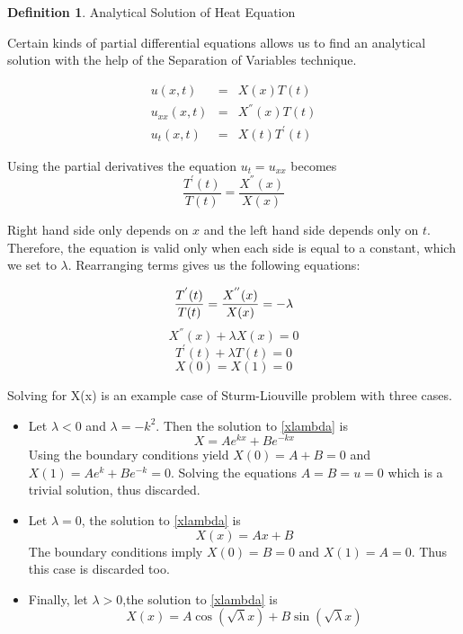 \documentclass[12pt, oneside]{book}
\theoremstyle{plain}
\theoremstyle{definition}
\newtheorem{definition}[theorem]{Definition}
\begin{document}
\begin{definition}\label{heatAnal} Analytical Solution of Heat Equation

Certain kinds of partial differential equations allows us to find an analytical solution with the help of the Separation of Variables technique.

\begin{eqnarray}
u(x,t) &=& X(x) T(t) \\[10pt]
u_{xx}(x, t) &=& X^{''}(x) T(t) \\[10pt]
u_t (x,t) &=& X(t) T^{'}(t)
\end{eqnarray}

Using the partial derivatives the equation $ u_t = u_{xx} $ becomes
\begin{equation}
\frac{T^{'}(t)}{T(t)} = \frac{X^{''}(x)}{X(x)}
\end{equation}

Right hand side only depends on $x$ and the left hand side depends only on $t$. Therefore, the equation is valid only when each side is equal to a constant, which we set to $ \lambda $. Rearranging terms gives us the following equations:

\begin{equation}
\frac{T^{'}(t)}{T(t)} = \frac{X^{''}(x)}{X(x)} = -\lambda \\[10pt]
\end{equation}
\begin{equation}\label{xlambda}
X^{''}(x)  + \lambda X(x) = 0 
\end{equation}
\begin{equation}\label{tlambda}
T^{'}(t) + \lambda T(t) = 0
\end{equation}
\begin{equation}
X(0) = X(1) = 0
\end{equation}

Solving for X(x) is an example case of Sturm-Liouville problem \cite{sepvar} with three cases. 
\begin{itemize}
\item Let $\lambda < 0$ and $\lambda = -k^2$. Then the solution to \ref{xlambda} is
$$ X = Ae^{kx} + Be^{-kx} $$
Using the boundary conditions yield $X(0) = A + B = 0 $ and $X(1) = Ae^{k} + Be^{-k} = 0$. Solving the equations $A=B=u=0$ which is a trivial solution, thus discarded.
\item Let $\lambda = 0$, the solution to \ref{xlambda} is
$$ X(x) = Ax + B $$
The boundary conditions imply $X(0) = B = 0$ and $X(1) = A= 0$. Thus this case is  discarded too.
\item Finally, let $\lambda>0$,the solution to \ref{xlambda} is
$$ X(x) = A \cos(\sqrt{\lambda}x) + B \sin(\sqrt{\lambda}x) $$


\end{itemize}
\end{definition}
\end{document}
